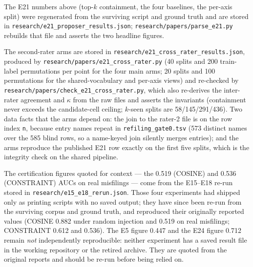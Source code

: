 \documentclass[11pt]{article}
\begin{document}
The E21 numbers above (top-$k$ containment, the four baselines, the
per-axis split) were regenerated from the surviving script and ground truth
and are stored in \texttt{research/e21\_proposer\_results.json};
\texttt{research/papers/parse\_e21.py} rebuilds that file and asserts the
two headline figures.

The second-rater arms are stored in
\texttt{research/e21\_cross\_rater\_results.json}, produced by
\texttt{research/papers/e21\_cross\_rater.py} (40 splits and 200 train-label
permutations per point for the four main arms; 20 splits and 100 permutations
for the shared-vocabulary and per-axis views) and re-checked by
\texttt{research/papers/check\_e21\_cross\_rater.py}, which also re-derives the
inter-rater agreement and $\kappa$ from the raw files and asserts the
invariants (containment never exceeds the candidate-cell ceiling; $k$-seen
splits are 58/145/291/436). Two data facts that the arms depend on: the join
to the rater-2 file is on the row index \texttt{n}, because entry names repeat
in \texttt{refiling\_gate0.tsv} (573 distinct names over the 585 blind rows,
so a name-keyed join silently merges entries); and the arms reproduce the
published E21 row exactly on the first five splits, which is the integrity
check on the shared pipeline.

The certification figures quoted for context --- the 0.519 (COSINE) and
0.536 (CONSTRAINT) AUCs on real misfilings --- come from the E15--E18
re-run stored in \texttt{research/e15\_e18\_rerun.json}. Those four
experiments had shipped only as printing scripts with no saved output; they
have since been re-run from the surviving corpus and ground truth, and
reproduced their originally reported values (COSINE 0.882 under random
injection and 0.519 on real misfilings; CONSTRAINT 0.612 and 0.536). The
E5 figure 0.447 and the E24 figure 0.712 remain \emph{not} independently
reproducible: neither experiment has a saved result file in the working
repository or the retired archive. They are quoted from the original
reports and should be re-run before being relied on.
\end{document}
